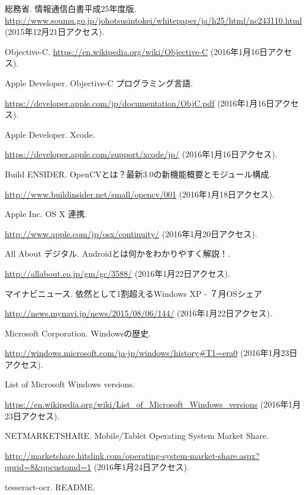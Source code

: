 \def\line{-\hspace*{-.7zw}-}

\begin{thebibliography}{99}

総務省. 情報通信白書平成25年度版.
\url{http://www.soumu.go.jp/johotsusintokei/whitepaper/ja/h25/html/nc243110.html}
(2015年12月21日アクセス).

Objective-C.
\url{https://en.wikipedia.org/wiki/Objective-C}
(2016年1月16日アクセス).

Apple Developer. Objective-C プログラミング言語.

\url{https://developer.apple.com/jp/documentation/ObjC.pdf}
(2016年1月16日アクセス).

Apple Developer. Xcode.

\url{https://developer.apple.com/support/xcode/jp/}
(2016年1月16日アクセス).

Build ENSIDER. OpenCVとは？最新3.0の新機能概要とモジュール構成.

\url{http://www.buildinsider.net/small/opencv/001}
(2016年1月18日アクセス).

Apple Inc. OS X 連携.

\url{http://www.apple.com/jp/osx/continuity/}
(2016年1月20日アクセス).

All About デジタル. Androidとは何かをわかりやすく解説！.

\url{http://allabout.co.jp/gm/gc/3588/}
(2016年1月22日アクセス).

マイナビニュース. 依然として1割超えるWindows XP - ７月OSシェア

\url{http://news.mynavi.jp/news/2015/08/06/144/}
(2016年1月22日アクセス).

Microsoft Corporation. Windowsの歴史.

\url{http://windows.microsoft.com/ja-jp/windows/history#T1=era0}
(2016年1月23日アクセス).

List of Microsoft Windows versions.

\url{https://en.wikipedia.org/wiki/List_of_Microsoft_Windows_versions}
(2016年1月23日アクセス).

NETMARKETSHARE. Mobile/Tablet Operating System Market Share.

\url{http://marketshare.hitslink.com/operating-system-market-share.aspx?qprid=8&qpcustomd=1}
(2016年1月24日アクセス).

tesseract-ocr. README.


\end{thebibliography}

